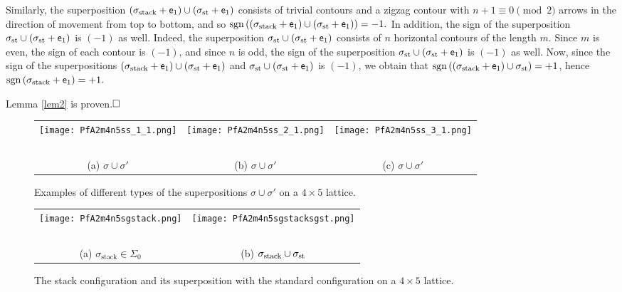 \documentclass[12pt,reqno]{amsart}
\numberwithin{equation}{section}
\newcommand{\sg}{\sigma}
\newcommand{\sgn}{{\operatorname{sgn}\,}}
\begin{document}
Similarly, the superposition $(\sigma_{\rm stack}+\mathsf e_1)\cup(\sigma_ {\rm st}+\mathsf e_1)$  consists of trivial contours and a zigzag contour with $n+1\equiv 0\pmod 2$ arrows in the direction of movement from top to bottom, and so $\sgn((\sigma_{\rm stack}+\mathsf e_1)\cup(\sigma_{\rm st}+\mathsf e_1))=-1.$ In addition, the sign of the superposition $\sigma_{\rm st}\cup(\sigma_{\rm st}+\mathsf e_1)$  is $(-1)$ as well. Indeed, the superposition $\sigma_{\rm st}\cup(\sigma_{\rm st}+\mathsf e_1)$  consists of 
$n$ horizontal contours of the length $m$. Since $m$ is even, the sign of 
each contour is $(-1)$, and
since $n$ is odd, the sign of the superposition $\sigma_{\rm st}\cup(\sigma_{\rm st}+\mathsf e_1)$  is $(-1)$ as well. Now, since the sign of the superpositions 
$(\sigma_{\rm stack}+\mathsf e_1)\cup(\sigma_{\rm st}+\mathsf e_1)$ and 
$\sigma_{\rm st}\cup(\sigma_{\rm st}+\mathsf e_1)$ is $(-1)$, we obtain that
$\sgn((\sigma_{\rm stack}+\mathsf e_1)\cup \sigma_{\rm st})=+1$,
hence $\sgn(\sigma_{\rm stack}+\mathsf e_1)=+1.$

Lemma \ref{lem2} is proven.$\hfill\square$
\begin{figure}[h]
\begin{tabular}{c c c}
\texttt{[image: PfA2m4n5ss\_1\_1.png]}&\hspace{.33in} \texttt{[image: PfA2m4n5ss\_2\_1.png]}&\hspace{.33in} \texttt{[image: PfA2m4n5ss\_3\_1.png]}\\ ${}$ \\
(a) $\sg\cup\sg'$ &\hspace{.2in} (b) $\sg\cup\sg'$ &\hspace{.2in} (c) $\sg\cup\sg'$
\end{tabular}
\caption{Examples of different types of the superpositions $\sg\cup\sg'$ on a $4\times 5$ lattice.}
\label{F1}
\end{figure}

\begin{figure}[h]
\begin{tabular}{c c}
\texttt{[image: PfA2m4n5sgstack.png]}&\hspace{.33in} \texttt{[image: PfA2m4n5sgstacksgst.png]}\\  ${}$ \\
(a) $\sg_{\textrm{stack}}\in\Sigma_0$ &\hspace{.2in} (b) $\sg_{\rm stack}\cup\sg_{\textrm{st}}$
\end{tabular}
\caption{The stack configuration and its superposition with the standard configuration  on a $4\times 5$ lattice.}
\label{FPfA2}
\end{figure}
\end{document}
